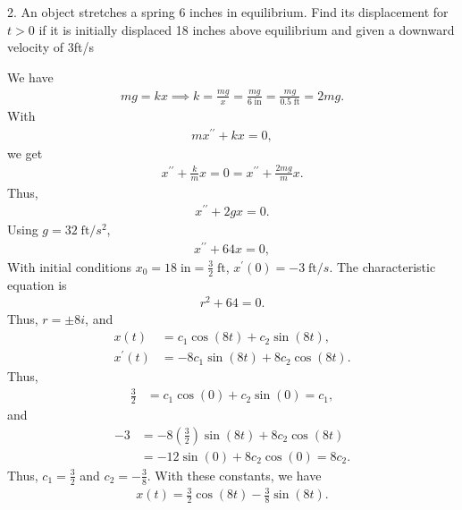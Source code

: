 \documentclass{report}
\begin{document}
    \pagebreak \bigbreak \noindent 
    \begin{mdframed}
        2. An object stretches a spring 6 inches in equilibrium. Find its displacement for $t > 0$ if it is initially displaced 18 inches above equilibrium and given a downward velocity of 3ft/s
    \end{mdframed}
    \bigbreak \noindent 
    We have
    \begin{align*}
        mg = kx \implies k = \frac{mg}{x} = \frac{mg}{6\; \text{in}} = \frac{mg}{0.5\; \text{ft}} = 2mg
    .\end{align*}
    With 
    \begin{align*}
        mx^{\prime\prime} + kx = 0
    ,\end{align*}
    we get 
    \begin{align*}
        x^{\prime\prime} + \frac{k}{m}x = 0 = x^{\prime\prime} + \frac{2mg}{m}x
    .\end{align*}
    Thus,
    \begin{align*}
        x^{\prime\prime} + 2gx = 0
    .\end{align*}
    Using $g = 32\; \text{ft}/s^{2}$, 
    \begin{align*}
        x^{\prime\prime} + 64x = 0
    ,\end{align*}
    With initial conditions $x_{0} = 18\; \text{in} = \frac{3}{2}\; \text{ft} $, $x^{\prime}(0) = -3\; \text{ft}/s $. The characteristic equation is
    \begin{align*}
        r^{2} + 64 = 0
    .\end{align*}
    Thus, $r = \pm 8i $, and
    \begin{align*}
        x(t) &= c_{1}\cos{\left(8t\right)} + c_{2}\sin{\left(8t\right)}, \\
        x^{\prime}(t) &= -8c_{1}\sin{\left(8t\right)} + 8c_{2}\cos{\left(8t\right)}
    .\end{align*}
    Thus,
    \begin{align*}
        \frac{3}{2} &= c_{1}\cos{\left(0\right)} + c_{2}\sin{\left(0\right)} = c_{1}
    ,\end{align*}
    and
    \begin{align*}
        -3 &= -8\left(\frac{3}{2}\right)\sin{\left(8t\right)} + 8c_{2}\cos{\left(8t\right)} \\
           &=-12\sin{\left(0\right)} + 8c_{2}\cos{\left(0\right)} = 8c_{2}
    .\end{align*}
    Thus, $c_{1} = \frac{3}{2} $ and $c_{2} = -\frac{3}{8} $. With these constants, we have 
    \begin{align*}
        x(t) = \frac{3}{2}\cos{\left(8t\right)} - \frac{3}{8}\sin{\left(8t\right)}
    .\end{align*}
    
\end{document}
